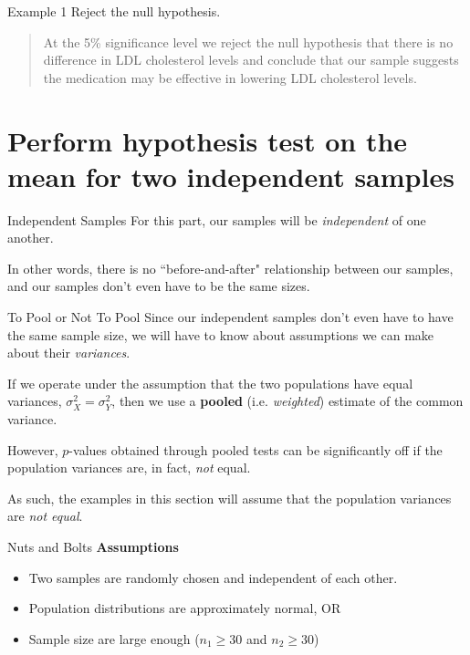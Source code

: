 \documentclass[t]{beamer}
\begin{document}
\begin{frame}{Example 1}
Reject the null hypothesis.		\newline\\	\pause
\begin{quote}
At the 5\% significance level we reject the null hypothesis that there is no difference in LDL cholesterol levels and conclude that our sample suggests the medication may be effective in lowering LDL cholesterol levels.
\end{quote}
\end{frame}

\section{Perform hypothesis test on the mean for two independent samples}

\begin{frame}{Independent Samples}
For this part, our samples will be \emph{independent} of one another.	\newline\\	\pause

In other words, there is no ``before-and-after" relationship between our samples, and our samples don't even have to be the same sizes.
\end{frame}

\begin{frame}{To Pool or Not To Pool}
Since our independent samples don't even have to have the same sample size, we will have to know about assumptions we can make about their \emph{variances}. \newline\\	\pause

If we operate under the assumption that the two populations have equal variances, $\sigma^2_X = \sigma^2_Y$, then we use a \textbf{pooled} (i.e. \textit{weighted}) estimate of the common variance. \newline\\	\pause

However, $p$-values obtained through pooled tests can be significantly off if the population variances are, in fact, \emph{not} equal. \newline\\	\pause

As such, the examples in this section will assume that the population variances are \emph{not equal}.
\end{frame}

\begin{frame}{Nuts and Bolts}
\textbf{Assumptions}
\begin{itemize}
\item<2-> Two samples are randomly chosen and independent of each other.
\item<3-> Population distributions are approximately normal, OR
\item<4-> Sample size are large enough ($n_1 \geq 30$ and $n_2 \geq 30$)
\end{itemize}
\bigskip
{}
\end{frame}
\end{document}
